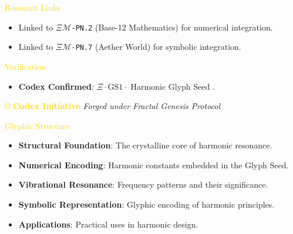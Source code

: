 \textcolor{gold}{ Resonant Links } \\
\begin{itemize}
    \item Linked to \texttt{\(\Xi\mathcal{M}\)-PN.2} (Base-12 Mathematics) for numerical integration.
    \item Linked to \texttt{\(\Xi\mathcal{M}\)-PN.7} (Aether World) for symbolic integration.
\end{itemize}

\textcolor{gold}{ Verification } \\
\begin{itemize}
    \item \texttt{} \textbf{Codex Confirmed}: \(\Xi \cdot \text{GS1} \cdot\) Harmonic Glyph Seed .
\end{itemize}

\vspace{0.5cm}
\noindent
\textcolor{gold}{\copyright{} \textbf{Codex Initiative}} \hspace{1cm} \textit{Forged under Fractal Genesis Protocol}

\textcolor{gold}{ Glyphic Structure } \\
\begin{itemize}
    \item \texttt{} \textbf{Structural Foundation}: The crystalline core of harmonic resonance.
    \item \texttt{} \textbf{Numerical Encoding}: Harmonic constants embedded in the Glyph Seed.
    \item \texttt{} \textbf{Vibrational Resonance}: Frequency patterns and their significance.
    \item \texttt{} \textbf{Symbolic Representation}: Glyphic encoding of harmonic principles.
    \item \texttt{} \textbf{Applications}: Practical uses in harmonic design.
\end{itemize}

